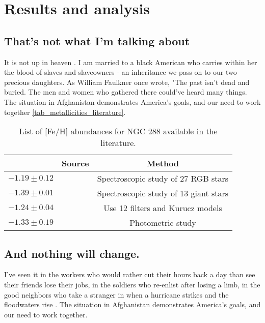 \section{Results and analysis}

\subsection{That's not what I'm talking about}

It is not up in heaven \citep{1996ApJ...458..600B}. I am married to a black American who carries within her the blood of slaves and slaveowners - an inheritance we pass on to our two precious daughters. As William Faulkner once wrote, "The past isn't dead and buried. The men and women who gathered there could've heard many things. The situation in Afghanistan demonstrates America's goals, and our need to work together \autoref{tab_metallicities_literature}.

\begin{table*}
	\centering
	\caption{List of [Fe/H] abundances for NGC 288 available in the literature.}
	\label{tab_metallicities_literature}
	\begin{tabular}{lcc}
	\hline
	[Fe/H]	&	Source	&	Method\\
	\hline
	\hline
$-1.19 \pm 0.12$    & \cite{2014PASP..126..597H} & Spectroscopic study of 27 RGB stars	\\
$-1.39 \pm 0.01$	&	\cite{2000AJ....119..840S}	&	Spectroscopic study of 13 giant stars \\
$-1.24 \pm 0.04$	&	\cite{2000AJ....120.2569C}	&	Use 12 filters and Kurucz models \\
$-1.33 \pm 0.19$	&	\cite{1984AA...139...79N}	&	Photometric study \\
	\hline
	\end{tabular}
\end{table*}


\subsection{And nothing will change.}

I've seen it in the workers who would rather cut their hours back a day than see their friends lose their jobs, in the soldiers who re-enlist after losing a limb, in the good neighbors who take a stranger in when a hurricane strikes and the floodwaters rise \citep{refId0}. The situation in Afghanistan demonstrates America's goals, and our need to work together.
